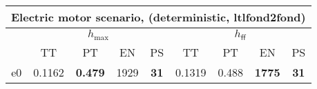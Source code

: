 \begin{tabular}{||c||c|c|c|c|c|c|c|c||}%
\multicolumn{9}{c}{\textbf{Electric motor scenario, (deterministic, ltlfond2fond)}}\\%
\hline%
&\multicolumn{4}{||c||}{$h_{\max}$}&\multicolumn{4}{||c||}{$h_{\mathsf{ff}}$}\\%
\hline%
&\small{TT}&\small{PT}&\small{EN}&\small{PS}&\small{TT}&\small{PT}&\small{EN}&\small{PS}\\%
\hline%
e0&\small{0.1162}&\small{\textbf{0.479}}&\small{1929}&\small{\textbf{31}}&\small{0.1319}&\small{0.488}&\small{\textbf{1775}}&\small{\textbf{31}}\\%
\hline%
\end{tabular}